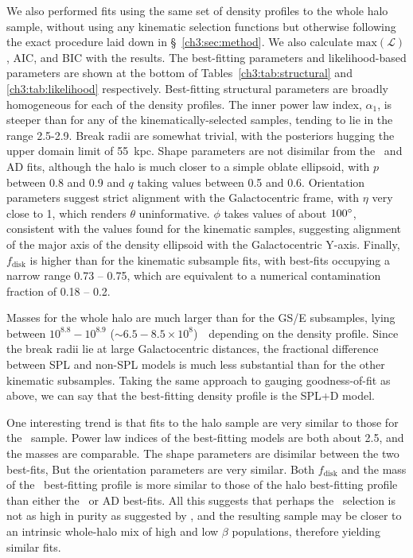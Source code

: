 We also performed fits using the same set of density profiles to the whole halo sample, without using any kinematic selection functions but otherwise following the exact procedure laid down in \S~\ref{ch3:sec:method}. We also calculate $\mathrm{max}(\mathcal{L})$, AIC, and BIC with the results. The best-fitting parameters and likelihood-based parameters are shown at the bottom of Tables~\ref{ch3:tab:structural} and \ref{ch3:tab:likelihood} respectively. Best-fitting structural parameters are broadly homogeneous for each of the density profiles. The inner power law index, $\alpha_{1}$, is steeper than for any of the kinematically-selected samples, tending to lie in the range 2.5-2.9. Break radii are somewhat trivial, with the posteriors hugging the upper domain limit of 55~kpc. Shape parameters are not disimilar from the \eLz\ and AD fits, although the halo is much closer to a simple oblate ellipsoid, with $p$ between 0.8 and 0.9 and $q$ taking values between 0.5 and 0.6. Orientation parameters suggest strict alignment with the Galactocentric frame, with $\eta$ very close to 1, which renders $\theta$ uninformative. $\phi$ takes values of about $100\hbox{$^\circ$}$, consistent with the values found for the kinematic samples, suggesting alignment of the major axis of the density ellipsoid with the Galactocentric Y-axis. Finally, $f_\mathrm{disk}$ is higher than for the kinematic subsample fits, with best-fits occupying a narrow range 0.73 -- 0.75, which are equivalent to a numerical contamination fraction of 0.18 -- 0.2.

Masses for the whole halo are much larger than for the GS/E subsamples, lying between $10^{8.8}-10^{8.9}$ ($\sim 6.5-8.5\times10^{8}$)~\Msun\ depending on the density profile. Since the break radii lie at large Galactocentric distances, the fractional difference between SPL and non-SPL models is much less substantial than for the other kinematic subsamples. Taking the same approach to gauging goodness-of-fit as above, we can say that the best-fitting density profile is the SPL+D model.

One interesting trend is that fits to the halo sample are very similar to those for the \JRLz\ sample. Power law indices of the best-fitting models are both about 2.5, and the masses are comparable. The shape parameters are disimilar between the two best-fits, But the orientation parameters are very similar. Both $f_\mathrm{disk}$ and the mass of the \JRLz\ best-fitting profile is more similar to those of the halo best-fitting profile than either the \eLz\ or AD best-fits. All this suggests that perhaps the \JRLz\ selection is not as high in purity as suggested by \cite{lane22}, and the resulting sample may be closer to an intrinsic whole-halo mix of high and low $\beta$ populations, therefore yielding similar fits.

